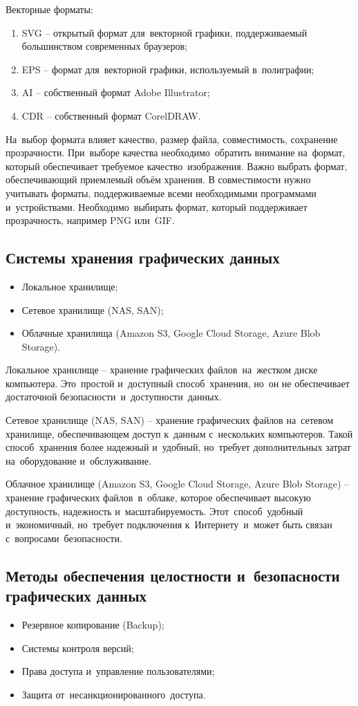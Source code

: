 \documentclass{ou}
\begin{document}
Векторные форматы:
\begin{enumerate}[itemindent=2em, nosep, label=\arabic*)]
\item SVG -- открытый формат для~векторной графики, поддерживаемый большинством современных браузеров;
\item EPS -- формат для~векторной графики, используемый в~полиграфии;
\item AI -- собственный формат Adobe Illustrator;
\item CDR -- собственный формат CorelDRAW.
\end{enumerate}

На~выбор формата влияет качество, размер файла, совместимость, сохранение прозрачности. При~выборе качества необходимо~обратить внимание на~формат, который обеспечивает требуемое качество~изображения. Важно выбрать формат, обеспечивающий приемлемый объём хранения. В совместимости нужно учитывать форматы, поддерживаемые всеми необходимыми программами и~устройствами. Необходимо~выбирать формат, который поддерживает прозрачность, например PNG или~GIF.
\subsection{Системы хранения графических данных}
\begin{itemize}[label=-, itemindent=2em, nosep]
\item Локальное хранилище;
\item Сетевое хранилище (NAS, SAN);
\item Облачные хранилища (Amazon S3, Google Cloud Storage, Azure Blob Storage).
\end{itemize}

Локальное хранилище -- хранение графических файлов~на~жестком диске компьютера. Это~простой и~доступный способ~хранения, но~он не обеспечивает достаточной безопасности~и~доступности~данных.

Сетевое хранилище (NAS, SAN) -- хранение графических файлов на~сетевом хранилище, обеспечивающем доступ к~данным с~нескольких компьютеров. Такой способ~хранения более надежный и~удобный, но~требует дополнительных затрат на~оборудование и~обслуживание.

Облачное хранилище (Amazon S3, Google Cloud Storage, Azure Blob Storage) -- хранение графических файлов~в~облаке, которое обеспечивает высокую доступность, надежность и~масштабируемость. Этот~способ~удобный и~экономичный, но~требует подключения к~Интернету~и~может быть связан с~вопросами~безопасности.
\subsection{Методы обеспечения целостности и~безопасности графических данных}
\begin{itemize}[label=-, itemindent=2em, nosep]
\item Резервное копирование (Backup);
\item Системы контроля версий;
\item Права доступа и~управление пользователями;
\item Защита от~несанкционированного~доступа.
\end{itemize}
\end{document}
